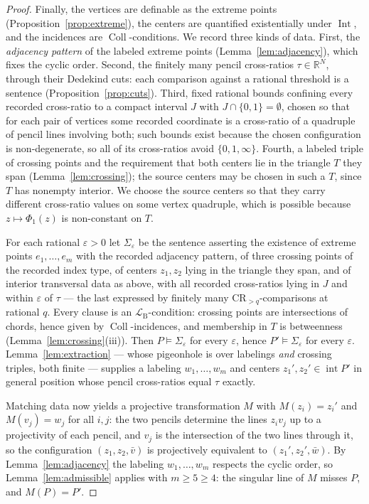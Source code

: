 \documentclass[11pt]{amsart}
\theoremstyle{definition}
\newcommand{\R}{\mathbb{R}}
\newcommand{\LB}{\mathcal{L}_{\mathrm{B}}}
\newcommand{\Int}{\operatorname{Int}}
\newcommand{\Coll}{\operatorname{Coll}}
\newcommand{\interior}{\operatorname{int}}
\begin{document}
\begin{proof}
Finally, the vertices are definable as the extreme points
(Proposition~\ref{prop:extreme}), the centers are quantified existentially
under $\Int$, and the incidences are $\Coll$-conditions. We record three
kinds of data. First, the \emph{adjacency pattern} of the labeled extreme
points (Lemma~\ref{lem:adjacency}), which fixes the cyclic order. Second,
the finitely many pencil cross-ratios $\tau\in\R^N$, through their Dedekind
cuts: each comparison against a rational threshold is a sentence
(Proposition~\ref{prop:cuts}). Third, fixed rational bounds confining every
recorded cross-ratio to a compact interval $J$ with $J\cap\{0,1\}=\emptyset$,
chosen so that for each pair of vertices some recorded coordinate is a
cross-ratio of a quadruple of pencil lines involving both; such bounds exist
because the chosen configuration is non-degenerate, so all of its
cross-ratios avoid $\{0,1,\infty\}$. Fourth, a labeled triple of crossing
points and the requirement that both centers lie in the triangle $T$ they
span (Lemma~\ref{lem:crossing}); the source centers may be chosen in such a
$T$, since $T$ has nonempty interior. We choose the source centers so that
they carry different cross-ratio values on some vertex quadruple, which is
possible because $z\mapsto\Phi_1(z)$ is non-constant on $T$.

For each rational $\varepsilon>0$ let $\Sigma_\varepsilon$ be the sentence
asserting the existence of extreme points $e_1,\dots,e_m$ with the recorded
adjacency pattern, of three crossing points of the recorded index type, of
centers $z_1,z_2$ lying in the triangle they span, and of interior
transversal data as above, with all recorded cross-ratios lying in $J$ and
within $\varepsilon$ of $\tau$ --- the last expressed by finitely many
$\mathrm{CR}_{>q}$-comparisons at rational $q$. Every clause is an
$\LB$-condition: crossing points are intersections of chords, hence given by
$\Coll$-incidences, and membership in $T$ is betweenness
(Lemma~\ref{lem:crossing}(iii)). Then $P\models
\Sigma_\varepsilon$ for every $\varepsilon$, hence
$P'\models\Sigma_\varepsilon$ for every $\varepsilon$. Lemma~\ref{lem:extraction} --- whose
pigeonhole is over labelings \emph{and} crossing triples, both finite ---
supplies a labeling $w_1,\dots,w_m$ and centers
$z_1',z_2'\in\interior P'$ in general position whose pencil cross-ratios
equal $\tau$ exactly.

Matching data now yields a projective transformation $M$ with $M(z_i)=z_i'$
and $M(v_j)=w_j$ for all $i,j$: the two pencils determine the lines $z_iv_j$
up to a projectivity of each pencil, and $v_j$ is the intersection of the two
lines through it, so the configuration $(z_1,z_2,\bar v)$ is projectively
equivalent to $(z_1',z_2',\bar w)$. By Lemma~\ref{lem:adjacency} the labeling
$w_1,\dots,w_m$ respects the cyclic order, so Lemma~\ref{lem:admissible}
applies with $m\ge5\ge4$: the singular line of $M$ misses $P$, and
$M(P)=P'$.
\end{proof}
\end{document}
